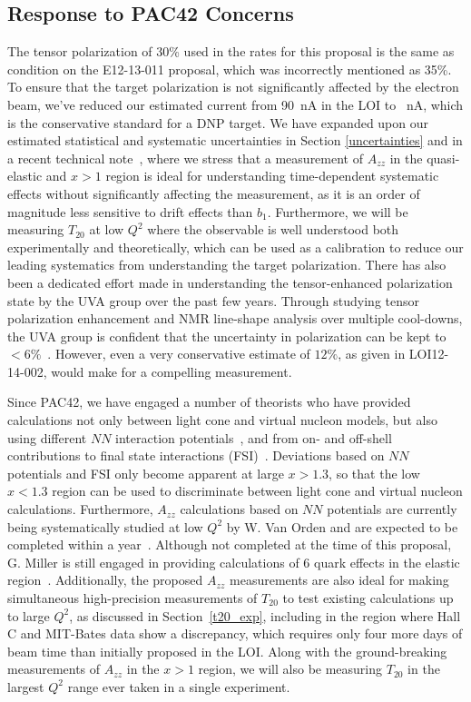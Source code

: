 \subsection{Response to PAC42 Concerns}
The tensor polarization of 30\% used in the rates for this proposal is the same as condition on the E12-13-011 proposal, which was incorrectly mentioned as 35\%. To ensure that the target polarization is not significantly affected by the electron beam, we've reduced our estimated current from 90~nA in the LOI to \CURRENT~nA, which is the conservative standard for a DNP target. We have expanded upon our estimated statistical and systematic uncertainties in Section \ref{uncertainties} and in a recent technical note~\cite{Keller:2015tn}, where we stress that a measurement of $A_{zz}$ in the quasi-elastic and $x>1$ region is ideal for understanding time-dependent systematic effects without significantly affecting the measurement, as it is an order of magnitude less sensitive to drift effects than $b_1$. Furthermore, we will be measuring $T_{20}$ at low $Q^2$ where the observable is well understood both experimentally and theoretically, which can be used as a calibration to reduce our leading systematics from understanding the target polarization. There has also been a dedicated effort made in understanding the tensor-enhanced polarization state by the UVA group over the past few years. Through studying tensor polarization enhancement and NMR line-shape analysis over multiple cool-downs, the UVA group is confident that the uncertainty in polarization can be kept to $<6\%$~\cite{keller2, keller3}. However, even a very conservative estimate of $12\%$, as given in LOI12-14-002, would make for a compelling measurement.

Since PAC42, we have engaged a number of theorists who have provided calculations not only between light cone and virtual nucleon models, but also using different $NN$ interaction potentials~\cite{Sargsian:2014fla}, and from on- and off-shell contributions to final state interactions (FSI)~\cite{cosyn-convo}. Deviations based on $NN$ potentials and FSI only become apparent at large $x>1.3$, so that the low $x<1.3$ region can be used to discriminate between light cone and virtual nucleon calculations. Furthermore, $A_{zz}$ calculations based on $NN$ potentials are currently being systematically studied at low $Q^2$ by W. Van Orden and are expected to be completed within a year~\cite{vanorden-convo}. Although not completed at the time of this proposal, G. Miller is still engaged in providing calculations of 6 quark effects in the elastic region~\cite{miller-convo}. Additionally, the proposed $A_{zz}$ measurements are also ideal for making simultaneous high-precision measurements of $T_{20}$ to test existing calculations up to large $Q^2$, as discussed in Section~\ref{t20_exp}, including in the region where Hall C and MIT-Bates data show a discrepancy, which requires only four more days of beam time than initially proposed in the LOI. Along with the ground-breaking measurements of $A_{zz}$ in the $x>1$ region, we will also be measuring $T_{20}$ in the largest $Q^2$ range ever taken in a single experiment.





